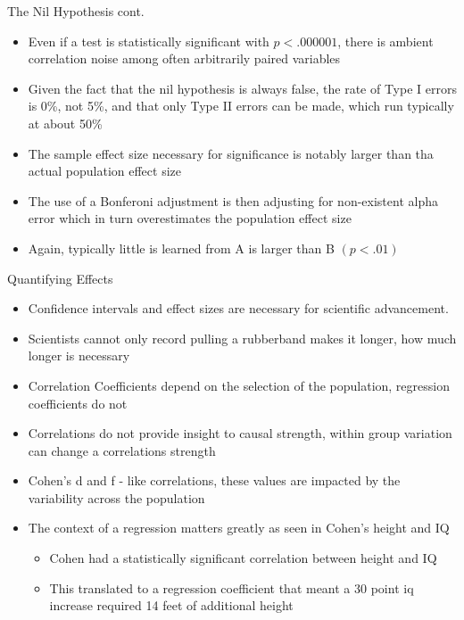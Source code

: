 \documentclass[aspectratio=169, 12pt]{beamer}
\begin{document}
\begin{frame}{The Nil Hypothesis cont.}
  \begin{itemize}
  \item Even if a test is statistically significant with $p < .000001$, there is ambient correlation noise among often arbitrarily paired variables
  \item Given the fact that the nil hypothesis is always false, the rate of Type I errors is 0\%, not 5\%, and that only Type II errors can be made, which run typically at about 50\%
  \item The sample effect size necessary for significance is notably larger than tha actual population effect size 
  \item The use of a Bonferoni adjustment is then adjusting for non-existent alpha error which in turn overestimates the population effect size
  \item Again, typically little is learned from A is larger than B $(p < .01)$
  \end{itemize}
\end{frame}

\begin{frame}{Quantifying Effects}
  \begin{itemize}
  \item Confidence intervals and effect sizes are necessary for scientific advancement. 
  \item Scientists cannot only record pulling a rubberband makes it longer, how much longer is necessary
  \item Correlation Coefficients depend on the selection of the population, regression coefficients do not
  \item Correlations do not provide insight to causal strength, within group variation can change a correlations strength
  \item Cohen's d and f - like correlations, these values are impacted by the variability across the population
  \item The context of a regression matters greatly as seen in Cohen's height and IQ 
    \begin{itemize}
    \item Cohen had a statistically significant correlation between height and IQ
    \item This translated to a regression coefficient that meant a 30 point iq increase required 14 feet of additional height
    \end{itemize}
  \end{itemize}
\end{frame}
\end{document}
